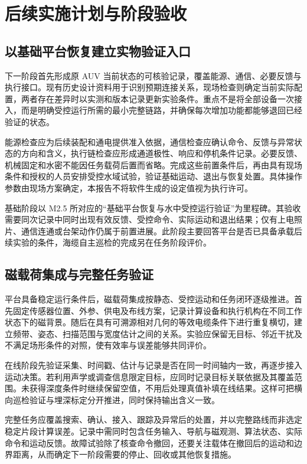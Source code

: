 \chapter{后续实施计划与阶段验收}\label{chap:middle-plan}
\section{以基础平台恢复建立实物验证入口}

下一阶段首先形成原 AUV 当前状态的可核验记录，覆盖能源、通信、必要反馈与执行接口。现有历史设计资料用于识别预期连接关系，现场检查则确定当前实际配置，两者存在差异时以实测和版本记录更新实验条件。重点不是将全部设备一次接入，而是明确受控运行所需的最小完整链路，并确保每次增加功能都能够退回已经验证的状态。

能源检查应为后续装配和通电提供准入依据，通信检查应确认命令、反馈与异常状态的方向和含义，执行链检查应形成通道极性、响应和停机条件记录。必要反馈、机械固定和水密不能因任务载荷后置而省略。完成这些前置条件后，再由具有现场条件和授权的人员安排受控水域试验，验证基础运动、退出与恢复处置。具体操作参数由现场方案确定，本报告不将软件生成的设定值视为执行许可。

基础阶段以 M2.5 所对应的“基础平台恢复与水中受控运行验证”为里程碑。其验收需要同次记录中同时出现有效反馈、受控命令、实际运动和退出结果；仅有上电照片、通信连通或台架动作仍属于前置进展。此阶段主要回答平台是否已具备承载后续实验的条件，海缆自主巡检的完成另在任务阶段评价。

\section{磁载荷集成与完整任务验证}

平台具备稳定运行条件后，磁载荷集成按静态、受控运动和任务闭环逐级推进。首先固定传感器位置、外参、供电及布线方案，记录计算设备和执行机构在不同工作状态下的磁背景。随后在具有可溯源相对几何的等效电缆条件下进行重复横切，建立频带、姿态、扫描范围与宽度估计之间的关系。实验应保留无目标、邻近干扰及不满足场形条件的对照，使有效率与误差能够共同评价。

在线阶段先验证采集、时间戳、估计与记录是否在同一时间轴内一致，再逐步接入运动决策。若利用声学或调查信息限定目标，应同时记录目标关联依据及其覆盖范围。未获得深度条件时继续保留空值，不用后处理真值补填在线结果。这样可把横向巡检验证与埋深标定分开推进，同时保持输出含义一致。

完整任务应覆盖搜索、确认、接入、跟踪及异常后的处置，并以完整路线而非选定稳定片段计算误差。记录中需同时包含任务输入、导航与磁观测、算法状态、实际命令和运动反馈。故障试验除了核查命令撤回，还要关注载体在撤回后的运动和边界距离，从而确定下一阶段需要的停止、回收或其他恢复措施。

